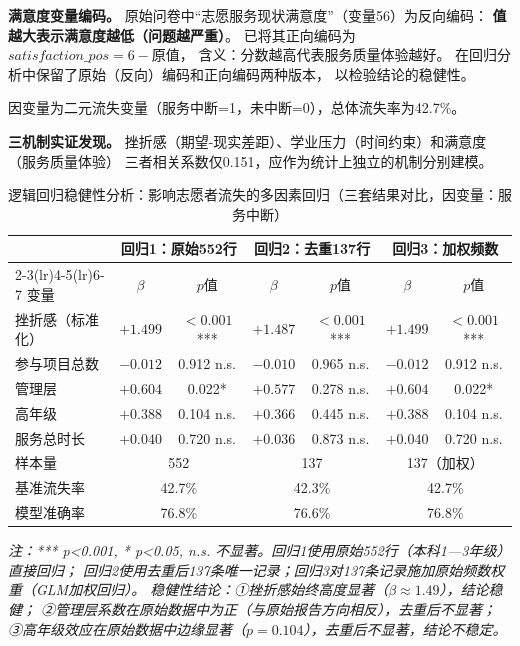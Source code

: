\documentclass[12pt,a4paper]{article}
\begin{document}
\textbf{满意度变量编码。}
原始问卷中“志愿服务现状满意度”（变量56）为反向编码：
\textbf{值越大表示满意度越低（问题越严重）}。
已将其正向编码为$satisfaction\_pos = 6 - 原值$，
含义：分数越高代表服务质量体验越好。
在回归分析中保留了原始（反向）编码和正向编码两种版本，
以检验结论的稳健性。

因变量为二元流失变量（服务中断=1，未中断=0），总体流失率为42.7\%。

\textbf{三机制实证发现。}
挫折感（期望-现实差距）、学业压力（时间约束）和满意度（服务质量体验）
三者相关系数仅0.151，应作为统计上独立的机制分别建模。

\begin{table}[htbp]
\caption{逻辑回归稳健性分析：影响志愿者流失的多因素回归（三套结果对比，因变量：服务中断）}
\centering
\scriptsize
\begin{tabular}{lcccccc}
\toprule
 & \multicolumn{2}{c}{回归1：原始552行} & \multicolumn{2}{c}{回归2：去重137行} & \multicolumn{2}{c}{回归3：加权频数} \\
\cmidrule(lr){2-3}\cmidrule(lr){4-5}\cmidrule(lr){6-7}
变量 & $\beta$ & $p$值 & $\beta$ & $p$值 & $\beta$ & $p$值 \\
\midrule
挫折感（标准化） & $+1.499$ & $<0.001$*** & $+1.487$ & $<0.001$*** & $+1.499$ & $<0.001$*** \\
参与项目总数 & $-0.012$ & 0.912 n.s. & $-0.010$ & 0.965 n.s. & $-0.012$ & 0.912 n.s. \\
管理层 & $+0.604$ & 0.022* & $+0.577$ & 0.278 n.s. & $+0.604$ & 0.022* \\
高年级 & $+0.388$ & 0.104 n.s. & $+0.366$ & 0.445 n.s. & $+0.388$ & 0.104 n.s. \\
服务总时长 & $+0.040$ & 0.720 n.s. & $+0.036$ & 0.873 n.s. & $+0.040$ & 0.720 n.s. \\
\midrule
样本量 & \multicolumn{2}{c}{552} & \multicolumn{2}{c}{137} & \multicolumn{2}{c}{137（加权）} \\
基准流失率 & \multicolumn{2}{c}{42.7\%} & \multicolumn{2}{c}{42.3\%} & \multicolumn{2}{c}{42.7\%} \\
模型准确率 & \multicolumn{2}{c}{76.8\%} & \multicolumn{2}{c}{76.6\%} & \multicolumn{2}{c}{76.8\%} \\
\bottomrule
\end{tabular}
\end{table}
\textit{注：*** p<0.001, * p<0.05, n.s. 不显著。回归1使用原始552行（本科1—3年级）直接回归；
回归2使用去重后137条唯一记录；回归3对137条记录施加原始频数权重（GLM加权回归）。
稳健性结论：①挫折感始终高度显著（$\beta\approx1.49$），结论稳健；
②管理层系数在原始数据中为正（与原始报告方向相反），去重后不显著；
③高年级效应在原始数据中边缘显著（$p=0.104$），去重后不显著，结论不稳定。}
\end{document}
